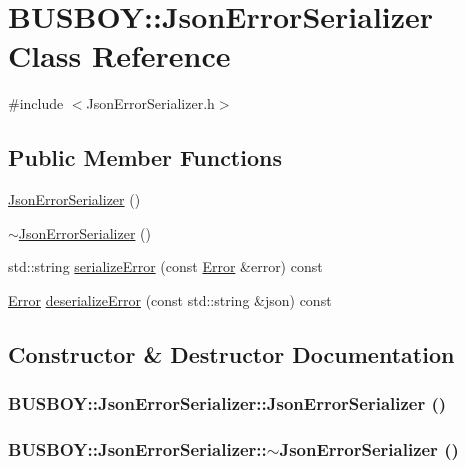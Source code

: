 \hypertarget{classBUSBOY_1_1JsonErrorSerializer}{
\section{BUSBOY::JsonErrorSerializer Class Reference}
\label{classBUSBOY_1_1JsonErrorSerializer}
}


{\ttfamily \#include $<$JsonErrorSerializer.h$>$}\subsection*{Public Member Functions}
\begin{DoxyCompactItemize}
\item 
\hyperlink{classBUSBOY_1_1JsonErrorSerializer_af16b470aa3b027728a5131bf6bebefcd}{JsonErrorSerializer} ()
\item 
\hyperlink{classBUSBOY_1_1JsonErrorSerializer_a6df298dc9859233135bdde22ad416915}{$\sim$JsonErrorSerializer} ()
\item 
std::string \hyperlink{classBUSBOY_1_1JsonErrorSerializer_a31b0c1fe7441228253449313c9c20df0}{serializeError} (const \hyperlink{classBUSBOY_1_1Error}{Error} \&error) const 
\item 
\hyperlink{classBUSBOY_1_1Error}{Error} \hyperlink{classBUSBOY_1_1JsonErrorSerializer_a693580f21972b231e31b704798b3d422}{deserializeError} (const std::string \&json) const 
\end{DoxyCompactItemize}


\subsection{Constructor \& Destructor Documentation}
\hypertarget{classBUSBOY_1_1JsonErrorSerializer_af16b470aa3b027728a5131bf6bebefcd}{
\subsubsection[{JsonErrorSerializer}]{\setlength{\rightskip}{0pt plus 5cm}BUSBOY::JsonErrorSerializer::JsonErrorSerializer ()}}
\label{classBUSBOY_1_1JsonErrorSerializer_af16b470aa3b027728a5131bf6bebefcd}
\hypertarget{classBUSBOY_1_1JsonErrorSerializer_a6df298dc9859233135bdde22ad416915}{
\subsubsection[{$\sim$JsonErrorSerializer}]{\setlength{\rightskip}{0pt plus 5cm}BUSBOY::JsonErrorSerializer::$\sim$JsonErrorSerializer ()}}
\label{classBUSBOY_1_1JsonErrorSerializer_a6df298dc9859233135bdde22ad416915}


